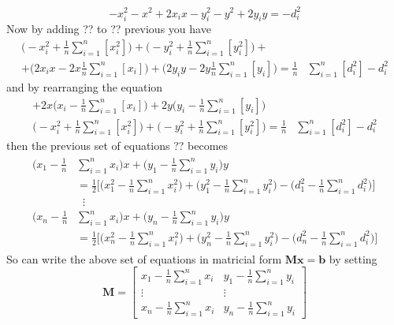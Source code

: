 \documentclass[12pt,twoside]{report}
\begin{document}
\begin{equation}
-x_i^2-x^2+2x_ix-y_i^2-y^2+2y_iy=-d_i^2      
\end{equation}
Now by adding ?? to ?? previous you have 
\begin{equation}
\begin{split}
    \bigg(-x_i^2  + \frac{1}{n}\sum_{i=1}^n[x_i^2]\bigg)+
    \bigg(-y_i^2+ \frac{1}{n}\sum_{i=1}^n[y_i^2]\bigg)+\\
    +\bigg(2x_ix-2x\frac{1}{n}\sum_{i=1}^n[x_i]\bigg)+
    \bigg(2y_iy -2y\frac{1}{n}\sum_{i=1}^n[y_i]\bigg)
    =\frac{1}{n}&\sum_{i=1}^n[d_i^2]-d_i^2
\end{split}    
\end{equation}
and by rearranging the equation
\begin{equation}
\begin{split}
    +2x\bigg(x_i-\frac{1}{n}\sum_{i=1}^n[x_i]\bigg)+
    2y\bigg(y_i -\frac{1}{n}\sum_{i=1}^n[y_i]\bigg)\\
    \bigg(-x_i^2  + \frac{1}{n}\sum_{i=1}^n[x_i^2]\bigg)+
    \bigg(-y_i^2+ \frac{1}{n}\sum_{i=1}^n[y_i^2]\bigg)
    =\frac{1}{n}&\sum_{i=1}^n[d_i^2]-d_i^2
\end{split}    
\end{equation}
then the previous set of equations ?? becomes
\begin{align}
\begin{split} 
    \bigg(x_1-\frac{1}{n}&\sum_{i=1}^nx_i\bigg)x+\bigg(y_1-\frac{1}{n}\sum_{i=1}^ny_i\bigg)y\\
    &=\frac{1}{2}\bigg[\bigg(x_1^2-\frac{1}{n}\sum_{i=1}^nx^2_i\bigg)+\bigg(y_1^2-\frac{1}{n}\sum_{i=1}^ny^2_i\bigg)-\bigg(d_1^2-\frac{1}{n}\sum_{i=1}^nd_i^2\bigg)\bigg]\\
&\;\;\vdots\\
    \bigg(x_n-\frac{1}{n}&\sum_{i=1}^nx_i\bigg)x+\bigg(y_n-\frac{1}{n}\sum_{i=1}^ny_i\bigg)y\\
    &=\frac{1}{2}\bigg[\bigg(x_n^2-\frac{1}{n}\sum_{i=1}^nx^2_i\bigg)+\bigg(y_n^2-\frac{1}{n}\sum_{i=1}^ny^2_i\bigg)-\bigg(d_n^2-\frac{1}{n}\sum_{i=1}^nd_i^2\bigg)\bigg]
\end{split}
\end{align}
So can write the above set of equations in matricial form $\mathbf{Mx}=\mathbf{b}$ by setting
$$
\mathbf{M}=\begin{bmatrix}
    x_1-\frac{1}{n}\sum_{i=1}^nx_i&y_1-\frac{1}{n}\sum_{i=1}^ny_i\\
    \vdots&\vdots\\
    x_n-\frac{1}{n}\sum_{i=1}^nx_i&y_n-\frac{1}{n}\sum_{i=1}^ny_i
\end{bmatrix}
$$
\end{document}
